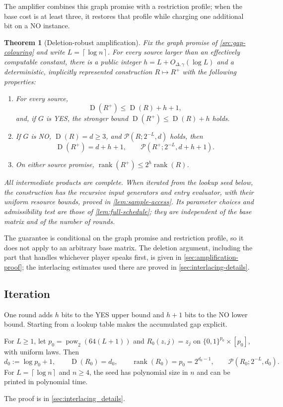 \documentclass[11pt]{article} \usepackage[utf8]{inputenc}
\theoremstyle{plain} \newtheorem{theorem}{Theorem}[section]
\theoremstyle{definition} \newaliascnt{definition}{theorem}
\newcommand{\D}{\operatorname{D}}
\newcommand{\RP}[3]{\mathcal{P}(#1;#2,#3)}
\newcommand{\ceil}[1]{\left\lceil#1\right\rceil}
\DeclareMathOperator{\rank}{rank} \crefname{claim}{Claim}{Claims}
\begin{document}
The amplifier combines this graph promise with a restriction profile; when the
base cost is at least three, it restores that profile while charging one
additional bit on a NO instance.

\begin{theorem}[Deletion-robust amplification]
\label{thm:amplifier}
Fix the graph promise of \cref{src:gap-colouring} and write \(L=\ceil{\log n}\).
For every source larger than an effectively computable constant, there is a
public integer \(h=L+O_{\Delta,\gamma}(\log L)\) and a deterministic, implicitly
represented construction \(R\mapsto R^+\) with the following properties:
\begin{enumerate}
\item[(i)] For every source,
\[
\D(R^+)\le\D(R)+h+1,
\]
and, if \(G\) is YES, the stronger bound \(\D(R^+)\le\D(R)+h\) holds.
\item[(ii)] If \(G\) is NO, \(\D(R)=d\ge3\), and \(\RP{R}{2^{-L}}{d}\) holds, then
\[
\D(R^+)=d+h+1,\qquad \RP{R^+}{2^{-L}}{d+h+1}.
\]
\item[(iii)] On either source promise, \(\rank(R^+)\le2^h\rank(R)\).
\end{enumerate}
All intermediate products are complete. When iterated from the lookup seed
below, the construction has the recursive input generators and entry evaluator,
with their uniform resource bounds, proved in \cref{lem:sample-access}. Its parameter
choices and admissibility test are those of \cref{lem:full-schedule}; they are
independent of the base matrix and of the number of rounds.
\end{theorem}

The guarantee is conditional on the graph promise and restriction profile, so it
does not apply to an arbitrary base matrix. The deletion argument, including the
part that handles whichever player speaks first, is given in
\cref{sec:amplification-proof}; the interlacing estimates used there are proved
in \cref{sec:interlacing-details}.


\subsection{Iteration}

One round adds $h$ bits to the YES upper bound and $h+1$ bits to the NO
lower bound. Starting from a lookup table makes the accumulated gap explicit.

\begin{lemma}\label{cl:seed}
For $L\ge1$, let $p_0=\operatorname{pow}_2(64(L+1))$ and
$R_0(z,j)=z_j$ on $\{0,1\}^{p_0}\times[p_0]$, with uniform laws. Then
\[
d_0:=\log p_0+1,\qquad \D(R_0)=d_0,\qquad
\rank(R_0)=p_0=2^{d_0-1},\qquad \RP{R_0}{2^{-L}}{d_0}.
\]
For $L=\ceil{\log n}$ and $n\ge4$, the seed has polynomial size in $n$
and can be printed in polynomial time.
\end{lemma}
The proof is in \cref{sec:interlacing_details}.
\end{document}
